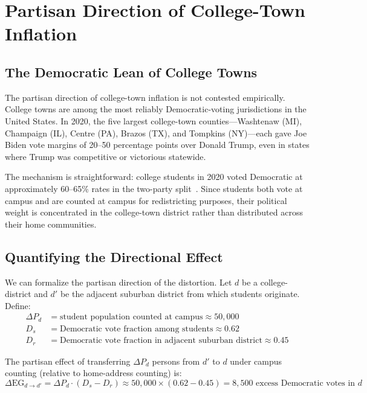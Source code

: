 \section{Partisan Direction of College-Town Inflation}
\label{sec:partisan}

\subsection{The Democratic Lean of College Towns}

The partisan direction of college-town inflation is not contested empirically. College towns are among the most reliably Democratic-voting jurisdictions in the United States. In 2020, the five largest college-town counties---Washtenaw (MI), Champaign (IL), Centre (PA), Brazos (TX), and Tompkins (NY)---each gave Joe Biden vote margins of 20--50 percentage points over Donald Trump, even in states where Trump was competitive or victorious statewide.

The mechanism is straightforward: college students in 2020 voted Democratic at approximately 60--65\% rates in the two-party split~\citep{nces2021voting}. Since students both vote at campus and are counted at campus for redistricting purposes, their political weight is concentrated in the college-town district rather than distributed across their home communities.

\subsection{Quantifying the Directional Effect}

We can formalize the partisan direction of the distortion. Let $d$ be a college-district and $d'$ be the adjacent suburban district from which students originate. Define:
\begin{align*}
\Delta P_d &= \text{student population counted at campus} \approx 50{,}000 \\
D_s &= \text{Democratic vote fraction among students} \approx 0.62 \\
D_r &= \text{Democratic vote fraction in adjacent suburban district} \approx 0.45
\end{align*}

The partisan effect of transferring $\Delta P_d$ persons from $d'$ to $d$ under campus counting (relative to home-address counting) is:
\[
\Delta \text{EG}_{d \to d'} = \Delta P_d \cdot (D_s - D_r) \approx 50{,}000 \times (0.62 - 0.45) = 8{,}500 \text{ excess Democratic votes in } d
\]

